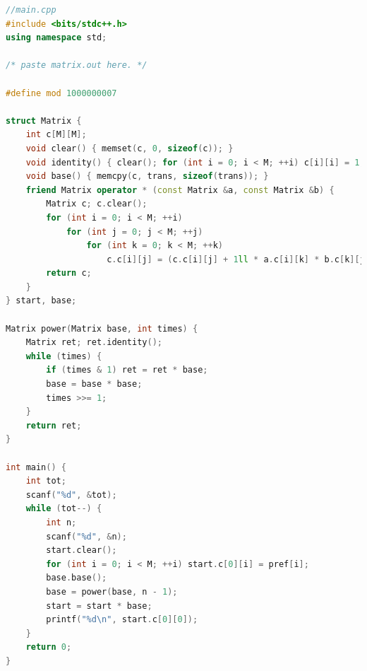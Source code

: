 \documentclass{article}
\begin{document}
\begin{lstlisting}[language=C++]
//main.cpp
#include <bits/stdc++.h>
using namespace std;

/* paste matrix.out here. */

#define mod 1000000007

struct Matrix {
    int c[M][M];
    void clear() { memset(c, 0, sizeof(c)); }
    void identity() { clear(); for (int i = 0; i < M; ++i) c[i][i] = 1; }
    void base() { memcpy(c, trans, sizeof(trans)); }
    friend Matrix operator * (const Matrix &a, const Matrix &b) {
        Matrix c; c.clear();
        for (int i = 0; i < M; ++i)
            for (int j = 0; j < M; ++j)
                for (int k = 0; k < M; ++k)
                    c.c[i][j] = (c.c[i][j] + 1ll * a.c[i][k] * b.c[k][j] % mod) % mod;
        return c;
    }
} start, base;

Matrix power(Matrix base, int times) {
    Matrix ret; ret.identity();
    while (times) {
        if (times & 1) ret = ret * base;
        base = base * base;
        times >>= 1;
    }
    return ret;
}

int main() {
    int tot;
    scanf("%d", &tot);
    while (tot--) {
        int n;
        scanf("%d", &n);
        start.clear();
        for (int i = 0; i < M; ++i) start.c[0][i] = pref[i];
        base.base();
        base = power(base, n - 1);
        start = start * base;
        printf("%d\n", start.c[0][0]);
    }
    return 0;
}
\end{lstlisting}
\end{document}

